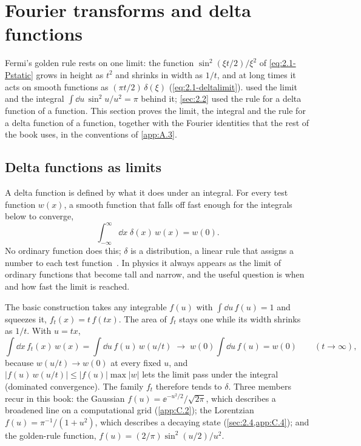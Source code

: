 \section{Fourier transforms and delta functions}\label{app:C.1}

Fermi's golden rule rests on one limit: the function $\sin^2(\xi t/2)/\xi^2$ of \cref{eq:2.1-Pstatic} grows in height as $t^2$ and shrinks in width as $1/t$, and at long times it acts on smooth functions as $(\pi t/2)\,\delta(\xi)$ (\cref{eq:2.1-deltalimit}).  used the limit and the integral $\int\dd u\,\sin^2u/u^2 = \pi$ behind it; \cref{sec:2.2} used the rule for a delta function of a function. This section proves the limit, the integral and the rule for a delta function of a function, together with the Fourier identities that the rest of the book uses, in the conventions of \cref{app:A.3}.

\subsection{Delta functions as limits}

A delta function is defined by what it does under an integral. For every test function $w(x)$, a smooth function that falls off fast enough for the integrals below to converge,
\begin{equation}
  \int_{-\infty}^{\infty}\dd x\;\delta(x)\,w(x) = w(0) .
  \label{eq:C.1-delta}
\end{equation}
No ordinary function does this; $\delta$ is a distribution, a linear rule that assigns a number to each test function~\cite[Sect.~1.16]{olver2010nist}. In physics it always appears as the limit of ordinary functions that become tall and narrow, and the useful question is when and how fast the limit is reached.

The basic construction takes any integrable $f(u)$ with $\int\dd u\,f(u) = 1$ and squeezes it, $f_t(x) = t\,f(tx)$. The area of $f_t$ stays one while its width shrinks as $1/t$. With $u = tx$,
\begin{equation*}
  \int\dd x\,f_t(x)\,w(x) = \int\dd u\,f(u)\,w(u/t) \;\longrightarrow\; w(0)\int\dd u\,f(u) = w(0) \qquad (t\to\infty),
\end{equation*}
because $w(u/t) \to w(0)$ at every fixed $u$, and $|f(u)\,w(u/t)| \le |f(u)|\max|w|$ lets the limit pass under the integral (dominated convergence). The family $f_t$ therefore tends to $\delta$. Three members recur in this book: the Gaussian $f(u) = \ee^{-u^2/2}/\sqrt{2\pi}$, which describes a broadened line on a computational grid (\cref{app:C.2}); the Lorentzian $f(u) = \pi^{-1}/(1 + u^2)$, which describes a decaying state (\cref{sec:2.4,app:C.4}); and the golden-rule function, $f(u) = (2/\pi)\sin^2(u/2)/u^2$.

